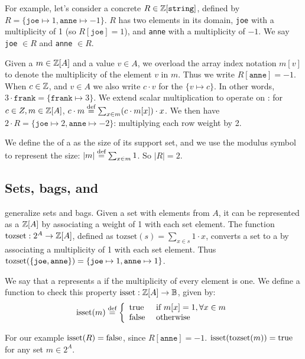 For example, let's consider a concrete \zr $R \in \mathbb{Z}[\texttt{string}]$,
defined by $R = \{ \texttt{joe} \mapsto 1, \texttt{anne} \mapsto -1 \}$.
$R$ has two elements in its domain,
\texttt{joe} with a multiplicity of 1 (so $R[\texttt{joe}] = 1$),
and \texttt{anne} with a multiplicity of $-1$.
We say \texttt{joe} $\in R$ and \texttt{anne} $\in R$.

Given a \zr $m \in \mathbb{Z}[A]$ and a value $v \in A$, we overload the array index notation
$m[v]$ to denote the multiplicity of the element $v$ in $m$.
Thus we write $R[\texttt{anne}] = -1$.
When $c \in \mathbb{Z}$, and $v \in A$ we also write $c \cdot v$ for the  \zr $\{
v \mapsto c \}$.  In other words, $3 \cdot \texttt{frank} = \{ \texttt{frank} \mapsto 3 \}$.
We extend scalar multiplication to operate on \zrs: for $c \in Z, m \in \mathbb{Z}[A]$,
$c \cdot m \stackrel{\textrm{\scriptsize def}}{=} \sum_{x \in m} (c \cdot m[x]) \cdot x$.  We then have
$2 \cdot R = \{ \texttt{joe} \mapsto 2, \texttt{anne} \mapsto -2 \}$: multiplying
each row weight by 2.

We define the  of a \zr as the size of its support set, and we use the
modulus symbol to represent the size: $|m| \stackrel{\textrm{\scriptsize def}}{=} \sum_{x \in m} 1$.  So $|R| = 2$.

\subsection{Sets, bags, and \zrs}

\zrs generalize sets and bags.
Given a set with elements from $A$, it can be represented as a \zr $\mathbb{Z}[A]$
by associating a weight of 1 with each set element.  The function $\mbox{tozset}: 2^A \to \mathbb{Z}[A]$,
defined as $\mbox{tozset}(s) = \sum_{x \in s} 1 \cdot x$,
converts a set to a \zr by associating a multiplicity of 1 with each set element.
Thus $\mbox{tozset}(\{ \mbox{\texttt{joe}}, \mbox{\texttt{anne}} \}) = \{ \mbox{\texttt{joe}} \mapsto 1, \mbox{\texttt{anne}} \mapsto 1 \}$.

\begin{definition}
We say that a \zr represents a  if the multiplicity of every
element is one.  We define a function to check this property
$\mbox{isset} : \mathbb{Z}[A] \rightarrow \mathbb{B}$, given by:
$$\mbox{isset}(m) \stackrel{\textrm{\scriptsize def}}{=} \left\{
\begin{array}{ll}
  \mbox{true} & \mbox{ if } m[x] = 1, \forall x \in m \\
  \mbox{false} & \mbox{ otherwise}
\end{array}
\right.
$$
\end{definition}
For our example $\mbox{isset}(R) = \mbox{false}$, since $R[\texttt{anne}] = -1$.
$\mbox{isset}(\mbox{tozset}(m)) = \mbox{true}$ for any set $m \in 2^A$.

